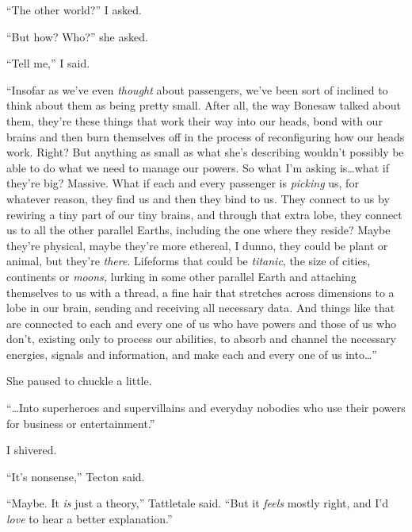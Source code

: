 ``The other world?'' I asked.



``But how?  Who?'' she asked.



``Tell me,'' I said.



``Insofar as we've even \emph{thought} about passengers, we've been sort of inclined to think about them as being pretty small.  After all, the way Bonesaw talked about them, they're these things that work their way into our heads, bond with our brains and then burn themselves off in the process of reconfiguring how our heads work.  Right?  But anything as small as what she's describing wouldn't possibly be able to do what we need to manage our powers.  So what I'm asking is\ldots what if they're big?  Massive.  What if each and every passenger is \emph{picking} us, for whatever reason, they find us and then they bind to us.  They connect to us by rewiring a tiny part of our tiny brains, and through that extra lobe, they connect us to all the other parallel Earths, including the one where they reside?  Maybe they're physical, maybe they're more ethereal, I dunno, they could be plant or animal, but they're \emph{there}.  Lifeforms that could be \emph{titanic}, the size of cities, continents or \emph{moon}\emph{s, }lurking in some other parallel Earth and attaching themselves to us with a thread, a fine hair that stretches across dimensions to a lobe in our brain, sending and receiving all necessary data\emph{.  }And things like that are\emph{ }connected to each and every one of us who have powers and those of us who don't, existing only to process our abilities, to absorb and channel the necessary energies, signals and information, and make each and every one of us into\ldots''



She paused to chuckle a little.



``\ldots{}Into superheroes and supervillains and everyday nobodies who use their powers for business or entertainment.''



I shivered.



``It's nonsense,'' Tecton said.



``Maybe.  It \emph{is} just a theory,'' Tattletale said.  ``But it \emph{feels} mostly right, and I'd \emph{love} to hear a better explanation.''



